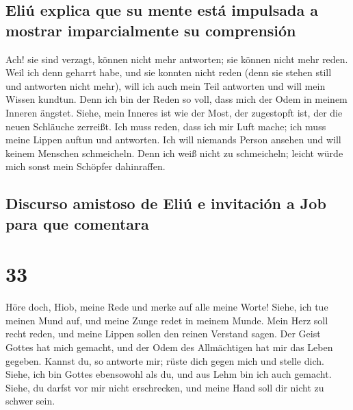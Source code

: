 \hypertarget{eliuxfa-explica-que-su-mente-estuxe1-impulsada-a-mostrar-imparcialmente-su-comprensiuxf3n}{%
\subsection{Eliú explica que su mente está impulsada a mostrar
imparcialmente su
comprensión}\label{eliuxfa-explica-que-su-mente-estuxe1-impulsada-a-mostrar-imparcialmente-su-comprensiuxf3n}}

 Ach! sie sind verzagt, können nicht mehr antworten; sie
können nicht mehr reden.  Weil ich denn geharrt habe, und
sie konnten nicht reden (denn sie stehen still und antworten nicht
mehr),  will ich auch mein Teil antworten und will mein
Wissen kundtun.  Denn ich bin der Reden so voll, dass
mich der Odem in meinem Inneren ängstet.  Siehe, mein
Inneres ist wie der Most, der zugestopft ist, der die neuen Schläuche
zerreißt.  Ich muss reden, dass ich mir Luft mache; ich
muss meine Lippen auftun und antworten.  Ich will
niemands Person ansehen und will keinem Menschen schmeicheln.
 Denn ich weiß nicht zu schmeicheln; leicht würde mich
sonst mein Schöpfer dahinraffen.

\hypertarget{discurso-amistoso-de-eliuxfa-e-invitaciuxf3n-a-job-para-que-comentara}{%
\subsection{Discurso amistoso de Eliú e invitación a Job para que
comentara}\label{discurso-amistoso-de-eliuxfa-e-invitaciuxf3n-a-job-para-que-comentara}}

\hypertarget{section-32}{%
\section{33}\label{section-32}}

 Höre doch, Hiob, meine Rede und merke auf alle meine
Worte!  Siehe, ich tue meinen Mund auf, und meine Zunge
redet in meinem Munde.  Mein Herz soll recht reden, und
meine Lippen sollen den reinen Verstand sagen.  Der Geist
Gottes hat mich gemacht, und der Odem des Allmächtigen hat mir das Leben
gegeben.  Kannst du, so antworte mir; rüste dich gegen
mich und stelle dich.  Siehe, ich bin Gottes ebensowohl
als du, und aus Lehm bin ich auch gemacht.  Siehe, du
darfst vor mir nicht erschrecken, und meine Hand soll dir nicht zu
schwer sein.

